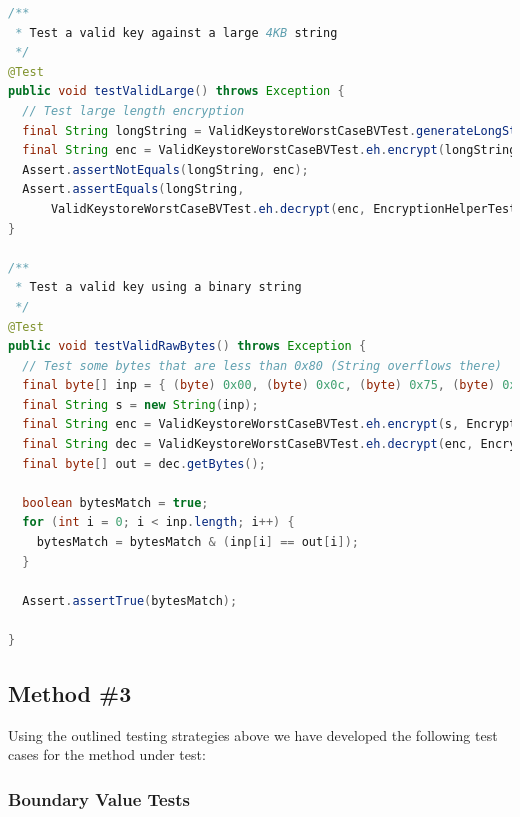 \begin{lstlisting}[language=Java]
/**
 * Test a valid key against a large 4KB string
 */
@Test
public void testValidLarge() throws Exception {
  // Test large length encryption
  final String longString = ValidKeystoreWorstCaseBVTest.generateLongString(4096);
  final String enc = ValidKeystoreWorstCaseBVTest.eh.encrypt(longString, EncryptionHelperTest.KEYNAME);
  Assert.assertNotEquals(longString, enc);
  Assert.assertEquals(longString,
      ValidKeystoreWorstCaseBVTest.eh.decrypt(enc, EncryptionHelperTest.KEYNAME));
}

/**
 * Test a valid key using a binary string
 */
@Test
public void testValidRawBytes() throws Exception {
  // Test some bytes that are less than 0x80 (String overflows there)
  final byte[] inp = { (byte) 0x00, (byte) 0x0c, (byte) 0x75, (byte) 0x00, (byte) 0x13 };
  final String s = new String(inp);
  final String enc = ValidKeystoreWorstCaseBVTest.eh.encrypt(s, EncryptionHelperTest.KEYNAME);
  final String dec = ValidKeystoreWorstCaseBVTest.eh.decrypt(enc, EncryptionHelperTest.KEYNAME);
  final byte[] out = dec.getBytes();

  boolean bytesMatch = true;
  for (int i = 0; i < inp.length; i++) {
    bytesMatch = bytesMatch & (inp[i] == out[i]);
  }

  Assert.assertTrue(bytesMatch);

}
\end{lstlisting}

\subsection{Method \#3}\label{method-3}

Using the outlined testing strategies above we have developed the
following test cases for the method under test:

\subsubsection{Boundary Value Tests}\label{boundary-value-tests-2}


